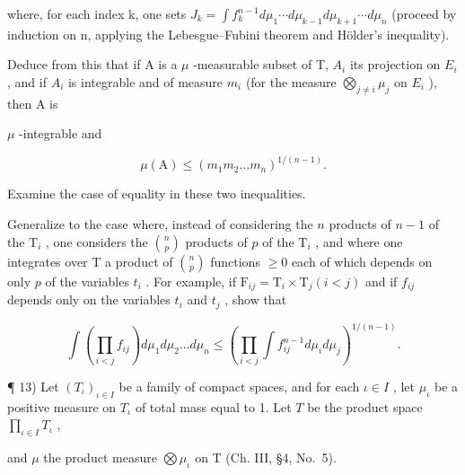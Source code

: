 where, for each index k, one sets \(J_{k}=\int f_{k}^{n-1}d\mu_{1}\cdots d\mu_{k-1}d\mu_{k+1}\cdots d\mu_{n}\) (proceed by induction on n, applying the Lebesgue--Fubini theorem and Hölder's inequality).

Deduce from this that if A is a \(\mu\) -measurable subset of T, \(A_{i}\) its projection on \(E_{i}\) , and if \(A_{i}\) is integrable and of measure \(m_{i}\) (for the measure \(\bigotimes_{j\neq i}\mu_{j}\) on \(E_{i}\) ), then A is

\(\mu\) -integrable and

\[
\mu (\mathrm{A}) \leqslant (m _ {1} m _ {2} \dots m _ {n}) ^ {1 / (n - 1)}.
\]

Examine the case of equality in these two inequalities.

Generalize to the case where, instead of considering the \(n\) products of \(n - 1\) of the \(\mathrm{T}_i\) , one considers the \(\binom{n}{p}\) products of \(p\) of the \(\mathrm{T}_i\) , and where one integrates over \(\mathrm{T}\) a product of \(\binom{n}{p}\) functions \(\geqslant 0\) each of which depends on only \(p\) of the variables \(t_i\) . For example, if \(\mathrm{F}_{ij} = \mathrm{T}_i \times \mathrm{T}_j (i < j)\) and if \(f_{ij}\) depends only on the variables \(t_i\) and \(t_j\) , show that

\[
\int \left(\prod_ {i <   j} f _ {i j}\right) d \mu_ {1} d \mu_ {2} \dots d \mu_ {n} \leqslant \left(\prod_ {i <   j} \int f _ {i j} ^ {n - 1} d \mu_ {i} d \mu_ {j}\right) ^ {1 / (n - 1)}.
\]

¶ 13) Let \((T_{\iota})_{\iota \in I}\) be a family of compact spaces, and for each \(\iota \in I\) , let \(\mu_{\iota}\) be a positive measure on \(T_{\iota}\) of total mass equal to 1. Let \(T\) be the product space \(\prod_{\iota \in I} T_{\iota}\) ,

and \(\mu\) the product measure \(\bigotimes \mu_{\iota}\) on T (Ch. III, §4, No.~5).

